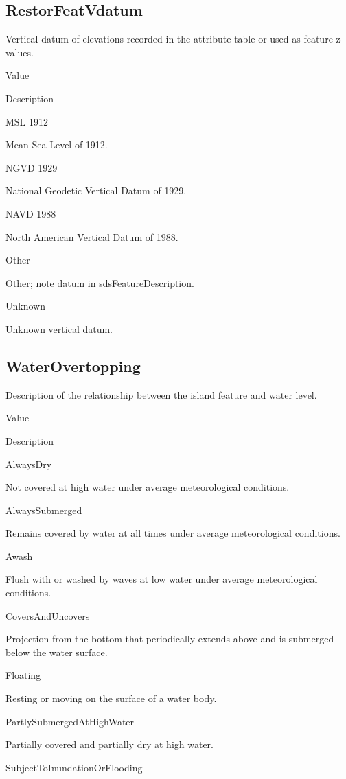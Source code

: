 \documentclass[
  letterpaper,
  DIV=11,
  numbers=noendperiod]{scrreprt}
\begin{document}
\subsection{RestorFeatVdatum}\label{restorfeatvdatum-7}

Vertical datum of elevations recorded in the attribute table or used as
feature z values.

Value

Description

MSL 1912

Mean Sea Level of 1912.

NGVD 1929

National Geodetic Vertical Datum of 1929.

NAVD 1988

North American Vertical Datum of 1988.

Other

Other; note datum in sdsFeatureDescription.

Unknown

Unknown vertical datum.

\subsection{WaterOvertopping}\label{waterovertopping}

Description of the relationship between the island feature and water
level.

Value

Description

AlwaysDry

Not covered at high water under average meteorological conditions.

AlwaysSubmerged

Remains covered by water at all times under average meteorological
conditions.

Awash

Flush with or washed by waves at low water under average meteorological
conditions.

CoversAndUncovers

Projection from the bottom that periodically extends above and is
submerged below the water surface.

Floating

Resting or moving on the surface of a water body.

PartlySubmergedAtHighWater

Partially covered and partially dry at high water.

SubjectToInundationOrFlooding
\end{document}
